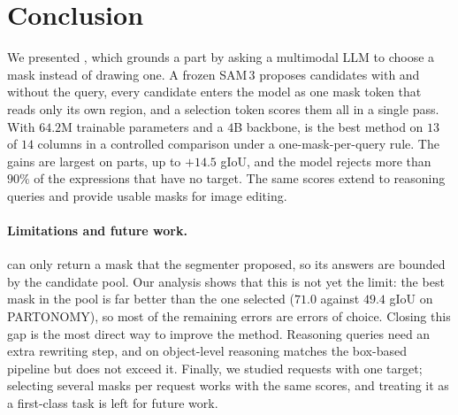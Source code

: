 \section{Conclusion}
\label{sec:conclusion}

We presented \ours{}, which grounds a part by asking a multimodal LLM to choose a mask instead of drawing one. A
frozen SAM\,3 proposes candidates with and without the query, every candidate enters the model as one mask token
that reads only its own region, and a selection token scores them all in a single pass. With $64.2$M trainable
parameters and a $4$B backbone, \ours{} is the best method on $13$ of $14$ columns in a controlled comparison under a
one-mask-per-query rule. The gains are largest on parts, up to $+14.5$ gIoU, and the model rejects more than
$90\%$ of the expressions that have no target. The same scores extend to reasoning queries and provide usable
masks for image editing.

\paragraph{Limitations and future work.}
\ours{} can only return a mask that the segmenter proposed, so its answers are bounded by the candidate pool.
Our analysis shows that this is not yet the limit: the best mask in the pool is far better than the one selected
($71.0$ against $49.4$ gIoU on PARTONOMY), so most of the remaining errors are errors of choice. Closing this gap is
the most direct way to improve the method. Reasoning queries need an extra rewriting step, and on object-level
reasoning \ours{} matches the box-based pipeline but does not exceed it. Finally, we studied requests with one
target; selecting several masks per request works with the same scores, and treating it as a first-class task is
left for future work.
